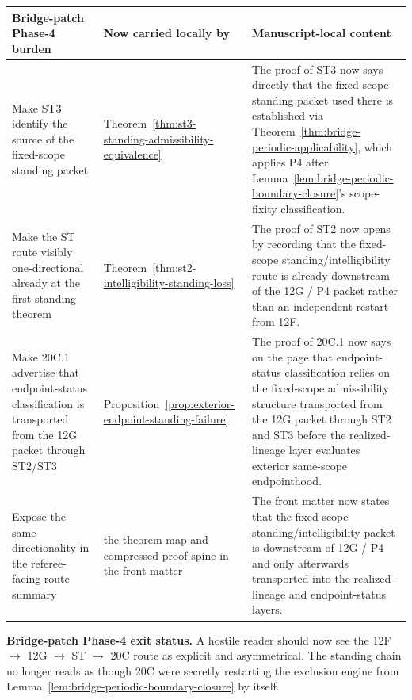 \begin{center}
\footnotesize
\renewcommand{\arraystretch}{1.16}
\setlength{\tabcolsep}{4pt}
\begin{tabularx}{0.98\textwidth}{@{}L{0.31\textwidth}L{0.24\textwidth}Y@{}}
\toprule
\textbf{Bridge-patch Phase-4 burden} & \textbf{Now carried locally by} & \textbf{Manuscript-local content}\\
\midrule
Make ST3 identify the source of the fixed-scope standing packet & Theorem~\ref{thm:st3-standing-admissibility-equivalence} & The proof of ST3 now says directly that the fixed-scope standing packet used there is established via Theorem~\ref{thm:bridge-periodic-applicability}, which applies P4 after Lemma~\ref{lem:bridge-periodic-boundary-closure}'s scope-fixity classification.\\
Make the ST route visibly one-directional already at the first standing theorem & Theorem~\ref{thm:st2-intelligibility-standing-loss} & The proof of ST2 now opens by recording that the fixed-scope standing/intelligibility route is already downstream of the 12G / P4 packet rather than an independent restart from 12F.\\
Make 20C.1 advertise that endpoint-status classification is transported from the 12G packet through ST2/ST3 & Proposition~\ref{prop:exterior-endpoint-standing-failure} & The proof of 20C.1 now says on the page that endpoint-status classification relies on the fixed-scope admissibility structure transported from the 12G packet through ST2 and ST3 before the realized-lineage layer evaluates exterior same-scope endpointhood.\\
Expose the same directionality in the referee-facing route summary & the theorem map and compressed proof spine in the front matter & The front matter now states that the fixed-scope standing/intelligibility packet is downstream of 12G / P4 and only afterwards transported into the realized-lineage and endpoint-status layers.\\
\bottomrule
\end{tabularx}
\end{center}

\noindent\textbf{Bridge-patch Phase-4 exit status.} A hostile reader should now see the 12F $\to$ 12G $\to$ ST $\to$ 20C route as explicit and asymmetrical. The standing chain no longer reads as though 20C were secretly restarting the exclusion engine from Lemma~\ref{lem:bridge-periodic-boundary-closure} by itself.

